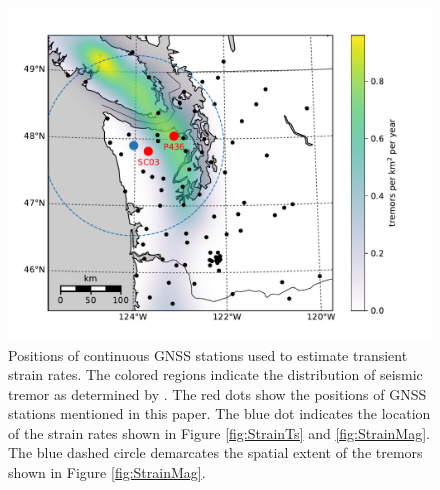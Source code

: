 \documentclass[extra,mreferee]{gji}
\begin{document}
\begin{figure}
\includegraphics{figures/context_map/context-map.pdf}
\caption{Positions of continuous GNSS stations used to estimate transient strain rates. The colored regions indicate the distribution of seismic tremor as determined by \citet{Wech2010}. The red dots show the positions of GNSS stations mentioned in this paper. The blue dot indicates the location of the strain rates shown in Figure \ref{fig:StrainTs} and \ref{fig:StrainMag}. The blue dashed circle demarcates the spatial extent of the tremors shown in Figure \ref{fig:StrainMag}.}    
\label{fig:Context}
\end{figure}
\end{document}
